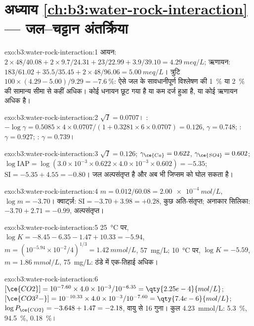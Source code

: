 \section*{अध्याय \ref{ch:b3:water-rock-interaction} --- जल--चट्टान अंतर्क्रिया}

\begin{solution}{exo:b3:water-rock-interaction:1}
आयन: $2\times48/40.08 + 2\times9.7/24.31 + 23/22.99 + 3.9/39.10 =
\qty{4.29}{meq/L}$; ऋणायन: $183/61.02 + 35.5/35.45 + 2\times48/96.06 =
\qty{5.00}{meq/L}$। त्रुटि $100\times(4.29 - 5.00)/9.29 = \qty{-7.6}{\percent}$:
ऐसे जल के सावधानीपूर्ण विश्लेषण की \qty{1}{\percent} या \qty{2}{\percent} की सामान्य सीमा से कहीं अधिक।
कोई धनायन छूट गया है या कम दर्ज हुआ है, या कोई ऋणायन अधिक है।
\end{solution}

\begin{solution}{exo:b3:water-rock-interaction:2}
$\sqrt I = 0.0707$। : $-\log\gamma = 0.5085\times4\times0.0707/(1 +
0.3281\times6\times0.0707) = 0.126$, $\gamma = 0.748$; : $\gamma =
0.927$; : $\gamma = 0.739$।
\end{solution}

\begin{solution}{exo:b3:water-rock-interaction:3}
$\sqrt I = 0.126$; $\gamma_{\ce{Ca}} = 0.622$, $\gamma_{\ce{SO4}} = 0.602$;
$\log\mathrm{IAP} = \log(3.0\times10^{-3}\times0.622\times4.0\times10^{-3}
\times0.602) = -5.35$; $\mathrm{SI} = -5.35 + 4.55 = -0.80$। जल अल्पसंतृप्त है
और अब भी जिप्सम को घोल सकता है।
\end{solution}

\begin{solution}{exo:b3:water-rock-interaction:4}
$m = 0.012/60.08 = \qty{2.00e-4}{mol/L}$, $\log m = -3.70$। क्वार्ट्ज़:
$\mathrm{SI} = -3.70 + 3.98 = +0.28$, कुछ अति-संतृप्त; अनाकार
सिलिका: $-3.70 + 2.71 = -0.99$, अल्पसंतृप्त।
\end{solution}

\begin{solution}{exo:b3:water-rock-interaction:5}
\qty{25}{\celsius} पर, $\log K = -8.45 - 6.35 - 1.47 + 10.33 = -5.94$, $m =
(10^{-5.94}\times10^{-2}/4)^{1/3} = \qty{1.42}{mmol/L}$, \qty{57}{mg/L}; \qty{10}{\celsius}
पर, $\log K = -5.59$, $m = \qty{1.86}{mmol/L}$,
\qty{75}{mg/L}: ठंडे में एक-तिहाई अधिक।
\end{solution}

\begin{solution}{exo:b3:water-rock-interaction:6}
$[\ce{CO2}] = 10^{-7.60}\times4.0\times10^{-3}/10^{-6.35} =
\qty{2.25e-4}{mol/L}$; $[\ce{CO3^2-}] = 10^{-10.33}\times4.0\times10^{-3}/
10^{-7.60} = \qty{7.4e-6}{mol/L}$; $\log P_{\ce{CO2}} = -3.648 + 1.47 =
-2.18$, वायु से 16 गुना। कुल \qty{4.23}{mmol/L}: 
\qty{5.3}{\percent},  \qty{94.5}{\percent}, 
\qty{0.18}{\percent}।
\end{solution}

